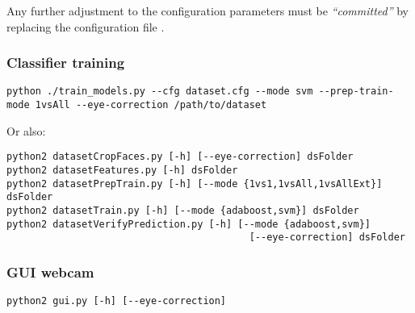Any further adjustment to the configuration parameters must be
\emph{``committed''} by replacing the configuration file
.

\subsubsection*{Classifier training}

\begin{verbatim}
python ./train_models.py --cfg dataset.cfg --mode svm --prep-train-mode 1vsAll --eye-correction /path/to/dataset
\end{verbatim}

Or also:

\begin{verbatim}
python2 datasetCropFaces.py [-h] [--eye-correction] dsFolder
python2 datasetFeatures.py [-h] dsFolder
python2 datasetPrepTrain.py [-h] [--mode {1vs1,1vsAll,1vsAllExt}] dsFolder
python2 datasetTrain.py [-h] [--mode {adaboost,svm}] dsFolder
python2 datasetVerifyPrediction.py [-h] [--mode {adaboost,svm}]
                                          [--eye-correction] dsFolder
\end{verbatim}

\subsubsection*{GUI webcam}

\begin{verbatim}
python2 gui.py [-h] [--eye-correction]
\end{verbatim}
